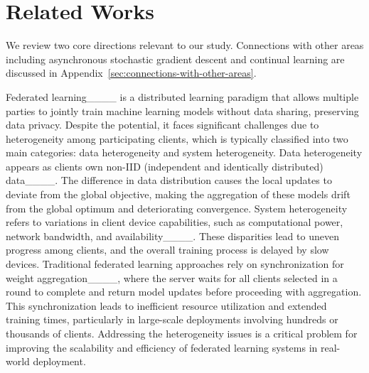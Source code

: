 \section{Related Works}
We review two core directions relevant to our study. Connections with other areas including asynchronous stochastic gradient descent and continual learning are discussed in Appendix~\ref{sec:connections-with-other-areas}.

Federated learning____ is a distributed learning paradigm that allows multiple parties to jointly train machine learning models without data sharing, preserving data privacy. Despite the potential, it faces significant challenges due to heterogeneity among participating clients, which is typically classified into two main categories: data heterogeneity and system heterogeneity. Data heterogeneity appears as clients own non-IID (independent and identically distributed) data____. The difference in data distribution causes the local updates to deviate from the global objective, making the aggregation of these models drift from the global optimum and deteriorating convergence. System heterogeneity refers to variations in client device capabilities, such as computational power, network bandwidth, and availability____. These disparities lead to uneven progress among clients, and the overall training process is delayed by slow devices. Traditional federated learning approaches rely on synchronization for weight aggregation____, where the server waits for all clients selected in a round to complete and return model updates before proceeding with aggregation. This synchronization leads to inefficient resource utilization and extended training times, particularly in large-scale deployments involving hundreds or thousands of clients. Addressing the heterogeneity issues is a critical problem for improving the scalability and efficiency of federated learning systems in real-world deployment.

